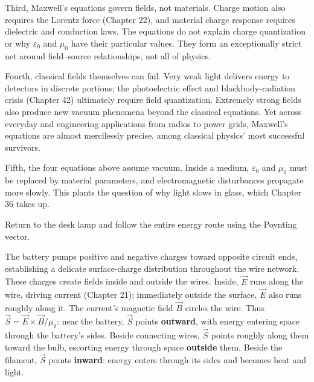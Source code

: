 Third, Maxwell's equations govern fields, not materials. Charge motion also requires the Lorentz force (Chapter 22), and material charge response requires dielectric and conduction laws. The equations do not explain charge quantization or why \(\varepsilon_0\) and \(\mu_0\) have their particular values. They form an exceptionally strict net around field--source relationships, not all of physics.

Fourth, classical fields themselves can fail. Very weak light delivers energy to detectors in discrete portions; the photoelectric effect and blackbody-radiation crisis (Chapter 42) ultimately require field quantization. Extremely strong fields also produce new vacuum phenomena beyond the classical equations. Yet across everyday and engineering applications from radios to power grids, Maxwell's equations are almost mercilessly precise, among classical physics' most successful survivors.

Fifth, the four equations above assume vacuum. Inside a medium, \(\varepsilon_0\) and \(\mu_0\) must be replaced by material parameters, and electromagnetic disturbances propagate more slowly. This plants the question of why light slows in glass, which Chapter 36 takes up.


Return to the desk lamp and follow the entire energy route using the Poynting vector.

The battery pumps positive and negative charges toward opposite circuit ends, establishing a delicate surface-charge distribution throughout the wire network. These charges create fields inside and outside the wires. Inside, \(\vec E\) runs along the wire, driving current (Chapter 21); immediately outside the surface, \(\vec E\) also runs roughly along it. The current's magnetic field \(\vec B\) circles the wire. Thus \(\vec S=\vec E\times\vec B/\mu_0\): near the battery, \(\vec S\) points \textbf{outward}, with energy entering space through the battery's sides. Beside connecting wires, \(\vec S\) points roughly along them toward the bulb, escorting energy through space \textbf{outside} them. Beside the filament, \(\vec S\) points \textbf{inward}: energy enters through its sides and becomes heat and light.

\begin{center}
\end{center}


